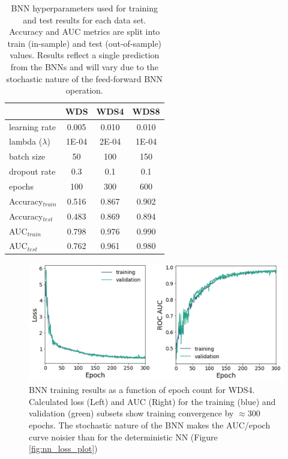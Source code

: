 \begin{table}[htp]
\centering
\begin{tabular}{l|c|c|c|}
\cline{2-4}
                                      & WDS   & WDS4  & WDS8  \\ \hline
\multicolumn{1}{|l|}{learning rate}   & 0.005 & 0.010 & 0.010 \\ \hline
\multicolumn{1}{|l|}{lambda ($\lambda$)} & 1E-04 & 2E-04 & 1E-04 \\ \hline
\multicolumn{1}{|l|}{batch size}      & 50    & 100   & 150   \\ \hline
\multicolumn{1}{|l|}{dropout rate}    & 0.3   & 0.1   & 0.1   \\ \hline
\multicolumn{1}{|l|}{epochs}          & 100   & 300   & 600   \\ \hline
\multicolumn{1}{|l|}{Accuracy$_{train}$} & 0.516 & 0.867 & 0.902 \\ \hline
\multicolumn{1}{|l|}{Accuracy$_{test}$}  & 0.483 & 0.869 & 0.894 \\ \hline
\multicolumn{1}{|l|}{AUC$_{train}$}      & 0.798 & 0.976 & 0.990 \\ \hline
\multicolumn{1}{|l|}{AUC$_{test}$}       & 0.762 & 0.961 & 0.980 \\ \hline
\end{tabular}
\singlespacing
\caption[Bayesian neural network single-run metrics]{BNN hyperparameters used for training and test results for each data set. Accuracy and AUC metrics are split into train (in-sample) and test (out-of-sample) values. Results reflect a single prediction from the BNNs and will vary due to the stochastic nature of the feed-forward BNN operation.}
\label{tab:bnn_metrics}
\end{table}

\begin{figure}[!htp]
\centering
\includegraphics[width=\textwidth]{templates/images/Figure-BNN_Loss_AUC_WDS4.png}
\caption[Bayesian neural network training loss]{BNN training results as a function of epoch count for WDS4. Calculated loss (Left) and AUC (Right) for the training (blue) and validation (green) subsets show training convergence by $\approx 300$ epochs. The stochastic nature of the BNN makes the AUC/epoch curve noisier than for the deterministic NN (Figure \ref{fig:nn_loss_plot})}
\label{fig:bnn_loss}
\end{figure}

